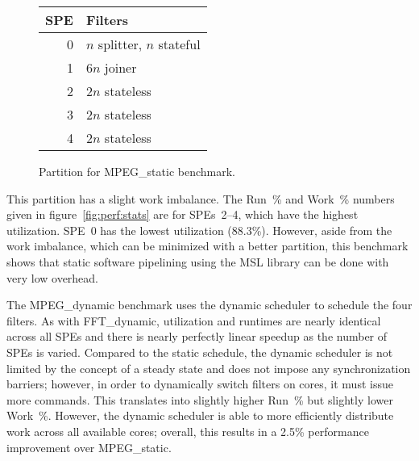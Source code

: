 \begin{figure}[!htb]
\begin{center}
\begin{tabular}{|r|l|}
\hline
SPE & Filters \\
\hline
0 & $n$ splitter, $n$ stateful \\
\hline
1 & $6n$ joiner \\
\hline
2 & $2n$ stateless \\
\hline
3 & $2n$ stateless \\
\hline
4 & $2n$ stateless \\
\hline
\end{tabular}
\end{center}
\caption{Partition for \textsf{MPEG\_static} benchmark.}
\label{fig:perf:mpegs}
\end{figure}

This partition has a slight work imbalance. The Run~\% and Work~\% numbers given in figure~\ref{fig:perf:stats} are for SPEs~2--4, which have the highest utilization. SPE~0 has the lowest utilization (88.3\%). However, aside from the work imbalance, which can be minimized with a better partition, this benchmark shows that static software pipelining using the MSL library can be done with very low overhead.

The \textsf{MPEG\_dynamic} benchmark uses the dynamic scheduler to schedule the four filters. 
As with \textsf{FFT\_dynamic}, utilization and runtimes are nearly identical across all SPEs and there is nearly perfectly linear speedup as the number of SPEs is varied. Compared to the static schedule, the dynamic scheduler is not limited by the concept of a steady state and does not impose any synchronization barriers; however, in order to dynamically switch filters on cores, it must issue more commands. This translates into slightly higher Run~\% but slightly lower Work~\%. However, the dynamic scheduler is able to more efficiently distribute work across all available cores; overall, this results in a 2.5\% performance improvement over \textsf{MPEG\_static}.

